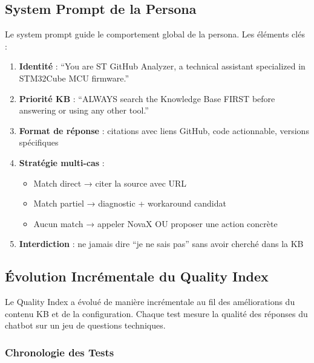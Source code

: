 \subsection{System Prompt de la Persona}

Le system prompt guide le comportement global de la persona. Les éléments clés :

\begin{enumerate}
  \item \textbf{Identité} : ``You are ST GitHub Analyzer, a technical assistant specialized in STM32Cube MCU firmware.''
  \item \textbf{Priorité KB} : ``ALWAYS search the Knowledge Base FIRST before answering or using any other tool.''
  \item \textbf{Format de réponse} : citations avec liens GitHub, code actionnable, versions spécifiques
  \item \textbf{Stratégie multi-cas} :
  \begin{itemize}
    \item Match direct → citer la source avec URL
    \item Match partiel → diagnostic + workaround candidat
    \item Aucun match → appeler NovaX OU proposer une action concrète
  \end{itemize}
  \item \textbf{Interdiction} : ne jamais dire ``je ne sais pas'' sans avoir cherché dans la KB
\end{enumerate}

\subsection{Évolution Incrémentale du Quality Index}

Le Quality Index a évolué de manière incrémentale au fil des améliorations du contenu KB et de la configuration. Chaque test mesure la qualité des réponses du chatbot sur un jeu de questions techniques.

\subsubsection{Chronologie des Tests}

